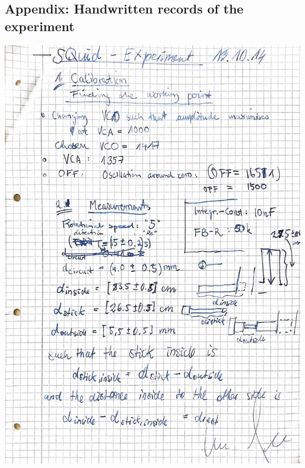 \subsection{Appendix: Handwritten records of the experiment}
\label{sec:records}
    \includegraphics[width=\linewidth]{appendix/page1.jpeg}
    \clearpage
